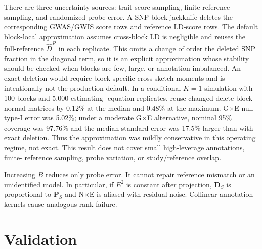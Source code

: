 \documentclass[11pt]{article}
\newcommand{\bP}{\bm P}
\newcommand{\bD}{\bm D}
\begin{document}
There are three uncertainty sources: trait-score sampling, finite reference
sampling, and randomized-probe error.  A SNP-block jackknife deletes the
corresponding GWAS/GWIS score rows and reference LD-score rows.  The default
block-local approximation assumes cross-block LD is negligible and reuses the
full-reference $\widehat D^R$ in each replicate.  This omits a change of order
the deleted SNP fraction in the diagonal term, so it is an explicit
approximation whose stability should be checked when blocks are few, large, or
annotation-imbalanced.  An exact deletion would require block-specific
cross-sketch moments and is intentionally not the production default.
In a conditional $K=1$ simulation with 100 blocks and 5,000 estimating-
equation replicates, reuse changed delete-block normal matrices by 0.12\% at
the median and 0.48\% at the maximum.  G$\times$E-null type-I error was 5.02\%;
under a moderate G$\times$E alternative, nominal 95\% coverage was 97.76\%
and the median standard error was 17.5\% larger than with exact deletion.
Thus the approximation was mildly conservative in this operating regime, not
exact.  This result does not cover small high-leverage annotations, finite-
reference sampling, probe variation, or study/reference overlap.

Increasing $B$ reduces only probe error.  It cannot repair reference mismatch
or an unidentified model.  In particular, if $E^2$ is constant after
projection, $\bD_S$ is proportional to $\bP_S$ and N$\times$E is aliased with
residual noise.  Collinear annotation kernels cause analogous rank failure.

\section{Validation}
\end{document}
